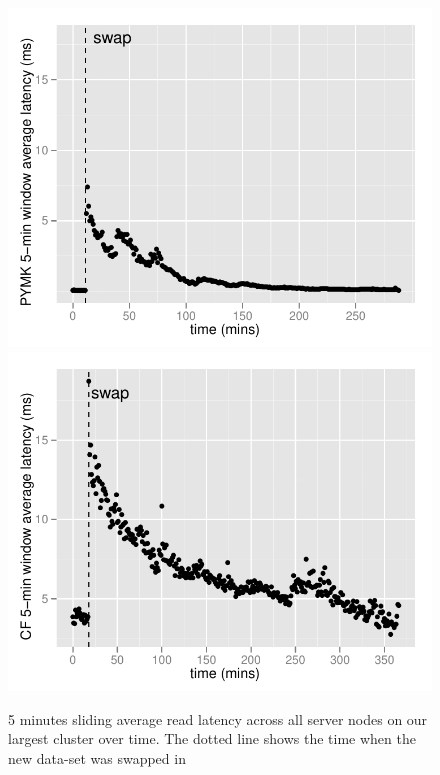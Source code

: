 \begin{figure}
  \centering
    \includegraphics[scale=0.55]{images/pymk_search.pdf}
    \includegraphics[scale=0.55]{images/browsemap_search.pdf}
  \caption{5 minutes sliding average read latency across all server nodes on our largest cluster over time. The dotted line shows the time when the new data-set was swapped in}
  \label{production}
\end{figure}

